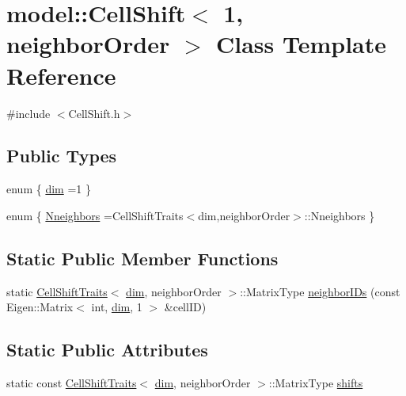 \hypertarget{classmodel_1_1_cell_shift_3_011_00_01neighbor_order_01_4}{}\section{model\+:\+:Cell\+Shift$<$ 1, neighbor\+Order $>$ Class Template Reference}
\label{classmodel_1_1_cell_shift_3_011_00_01neighbor_order_01_4}


{\ttfamily \#include $<$Cell\+Shift.\+h$>$}

\subsection*{Public Types}
\begin{DoxyCompactItemize}
\item 
enum \{ \hyperlink{classmodel_1_1_cell_shift_3_011_00_01neighbor_order_01_4_a3278061f7d0e6dc4cf8bfdc41c905279a7d09f043223542f703a6a3fe8eb441ae}{dim} =1
 \}
\item 
enum \{ \hyperlink{classmodel_1_1_cell_shift_3_011_00_01neighbor_order_01_4_a3c4abfa3cf3bb4ccc010545b5390af39a7a74857b3d589ba15bcbfc9c2d7f75f1}{Nneighbors} =Cell\+Shift\+Traits$<$dim,neighbor\+Order$>$\+:\+:Nneighbors
 \}
\end{DoxyCompactItemize}
\subsection*{Static Public Member Functions}
\begin{DoxyCompactItemize}
\item 
static \hyperlink{structmodel_1_1_cell_shift_traits}{Cell\+Shift\+Traits}$<$ \hyperlink{classmodel_1_1_cell_shift_3_011_00_01neighbor_order_01_4_a3278061f7d0e6dc4cf8bfdc41c905279a7d09f043223542f703a6a3fe8eb441ae}{dim}, neighbor\+Order $>$\+::Matrix\+Type \hyperlink{classmodel_1_1_cell_shift_3_011_00_01neighbor_order_01_4_a92f03f605c976a9523f7fa61fec797b4}{neighbor\+I\+Ds} (const Eigen\+::\+Matrix$<$ int, \hyperlink{classmodel_1_1_cell_shift_3_011_00_01neighbor_order_01_4_a3278061f7d0e6dc4cf8bfdc41c905279a7d09f043223542f703a6a3fe8eb441ae}{dim}, 1 $>$ \&cell\+I\+D)
\end{DoxyCompactItemize}
\subsection*{Static Public Attributes}
\begin{DoxyCompactItemize}
\item 
static const \hyperlink{structmodel_1_1_cell_shift_traits}{Cell\+Shift\+Traits}$<$ \hyperlink{classmodel_1_1_cell_shift_3_011_00_01neighbor_order_01_4_a3278061f7d0e6dc4cf8bfdc41c905279a7d09f043223542f703a6a3fe8eb441ae}{dim}, neighbor\+Order $>$\+::Matrix\+Type \hyperlink{classmodel_1_1_cell_shift_3_011_00_01neighbor_order_01_4_a2337ec3815b7a5bb83d6c6d15720766a}{shifts}
\end{DoxyCompactItemize}
